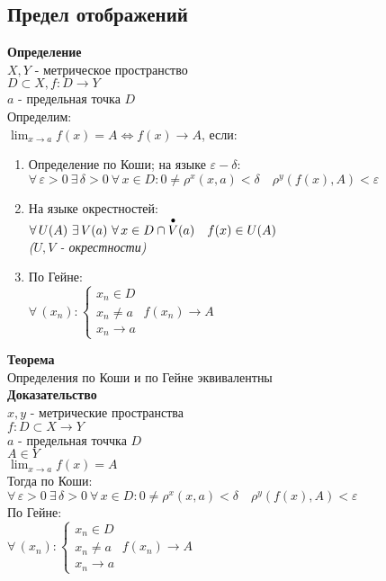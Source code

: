 \documentclass[12pt]{article}
\begin{document}
\subsection{Предел отображений}
\textbf{Определение}\\
$X, Y$ - метрическое пространство\\
$D\subset X, f:D\rightarrow Y$\\
$a$ - предельная точка $D$\\
Определим:\\
$\lim_{x\rightarrow a} f(x) = A \Leftrightarrow f(x)\rightarrow A$, если:
\begin{enumerate}
    \item Определение по Коши; на языке $\varepsilon-\delta$:\\
    $\forall\,\varepsilon > 0\ \exists\,\delta>0\ \forall\,x\in D: 0\neq \rho^x(x,a)<\delta\quad\rho^y(f(x),A) < \varepsilon$
    \item На языке окрестностей:\\
    $\forall\,U(A)\ \exists\,V(a)\ \forall\,x\in D \cap \overset{\bullet}{V}(a)\quad f(x)\in U(A)$\\
    \textit{($U, V$ - окрестности)}
    \item По Гейне:\\
    $\forall\,(x_n): \left\{\begin{array}{l}
        x_n \in D  \\
        x_n \neq a\\
        x_n \rightarrow a
    \end{array}\right.\ f(x_n)\rightarrow A$
\end{enumerate}
\textbf{Теорема}\\
Определения по Коши и по Гейне эквивалентны\\
\textbf{Доказательство}\\
$x,y$ - метрические пространства\\
$f:D\subset X \rightarrow Y$\\
$a$ - предельная точчка $D$\\
$A \in Y$\\
$\lim_{x\rightarrow a} f(x) = A$\\
Тогда по Коши:\\
$\forall\,\varepsilon > 0\ \exists\,\delta>0\ \forall\,x\in D: 0\neq \rho^x(x,a)<\delta\quad\rho^y(f(x),A) < \varepsilon$\\
По Гейне:\\
$\forall\,(x_n): \left\{\begin{array}{l}
        x_n \in D  \\
        x_n \neq a\\
        x_n \rightarrow a
\end{array}\right.\ f(x_n)\rightarrow A$
\end{document}

